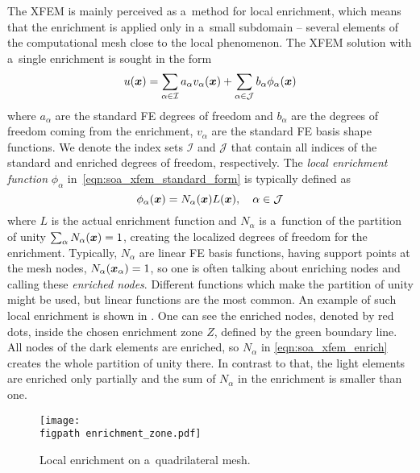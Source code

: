 The XFEM is mainly perceived as a~method for local enrichment, which means that the enrichment is applied only
in a~small subdomain -- several elements of the computational mesh close to the local phenomenon.
The XFEM solution with a~single enrichment is sought in the form
\begin{equation} \label{eqn:soa_xfem_standard_form}
  u(\mathbf{\boldsymbol{x}}) = \sum_{\alpha\in\mathcal{I}}a_\alpha v_\alpha(\mathbf{\boldsymbol{x}})
    + \sum_{\alpha\in\mathcal{J}} b_{\alpha} \phi_{\alpha}(\mathbf{\boldsymbol{x}})
\end{equation}
where $a_\alpha$ are the standard FE degrees of freedom and $b_{\alpha}$ are the degrees of freedom coming from
the enrichment, $v_\alpha$ are the standard FE basis shape functions. We denote the index sets $\mathcal{I}$ and
$\mathcal{J}$ that contain all indices of the standard and enriched degrees of freedom, respectively.
The \emph{local enrichment function} $\phi_{\alpha}$ in~\eqref{eqn:soa_xfem_standard_form} is typically defined as
\begin{equation} \label{eqn:soa_xfem_enrich}
    \phi_{\alpha}(\mathbf{\boldsymbol{x}}) = N_\alpha(\mathbf{\boldsymbol{x}})L(\mathbf{\boldsymbol{x}}), \quad \alpha\in\mathcal{J}
\end{equation}
where $L$ is the actual enrichment function and $N_\alpha$ is a~function of the partition of unity
$\sum_\alpha N_\alpha(\mathbf{\boldsymbol{x}}) = 1$, creating the localized degrees of freedom for the enrichment.
Typically, $N_\alpha$ are linear FE basis functions, having support points at the mesh nodes, $N_\alpha(\mathbf{\boldsymbol{x}}_\alpha)=1$,
so one is often talking about enriching nodes and calling these \emph{enriched nodes}.
Different functions which make the partition of unity might be used, but linear functions are the most common.
An example of such local enrichment is shown in . One can see the enriched nodes, denoted
by red dots, inside the chosen enrichment zone $Z$, defined by the green boundary line. All nodes of the dark elements
are enriched, so $N_\alpha$ in \eqref{eqn:soa_xfem_enrich} creates the whole partition of unity there. In contrast to that, 
the light elements are enriched only partially and the sum of $N_\alpha$ in the enrichment is smaller than one.

\begin{figure}[!htb]
  \centering    
    \texttt{[image: \\figpath enrichment\_zone.pdf]}
  \caption[Localized enrichment.]{Local enrichment on a~quadrilateral mesh. }
  \label{fig:enrichment_zone}
\end{figure}
%     

